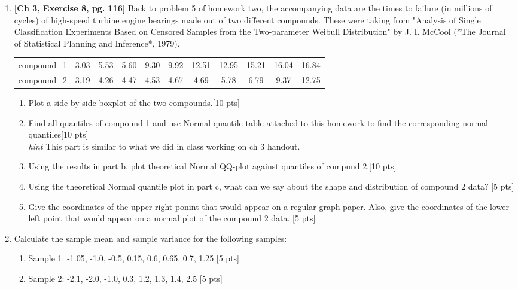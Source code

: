 \documentclass[11pt]{article}\usepackage[]{graphicx}\usepackage[]{color}
\begin{document}
\begin{enumerate}
\item \textbf{[Ch 3, Exercise 8, pg. 116]} Back to problem 5 of homework two,  the accompanying data are the times to failure (in millions of cycles) of high-speed turbine engine bearings made out of two different compounds. These were taking from "Analysis of Single Classification Experiments Based on Censored Samples from the Two-parameter Weibull Distribution" by J. I. McCool (*The Journal of Statistical Planning and Inference*, 1979).
    

\begin{center}
	\begin{tabular}{|ccccccccccc|}	
		\hline
		compound_1  & 3.03 & 5.53 & 5.60 & 9.30 & 9.92 & 12.51 & 12.95 & 15.21 & 16.04 & 16.84\\
		compound_2 & 3.19 & 4.26 & 4.47 & 4.53 & 4.67 & 4.69 & 5.78 & 6.79 & 9.37 & 12.75\\
		\hline
	\hline                 
	\end{tabular}
\end{center}

\begin{enumerate}
    \item Plot a side-by-side boxplot of the two compounds.[10 pts]
    \item Find all quantiles of compound 1 and use Normal quantile table attached to this homework to find the corresponding normal quantiles[10 pts]\\
    \emph{hint} This part is similar to what we did in class working on ch 3 handout. 
    \item Using the results in part b, plot theoretical Normal QQ-plot against quantiles of compund 2.[10 pts]
    \item Using the theoretical Normal quantile plot in part c, what can we say about the shape and distribution of compound 2 data? [5 pts]
    \item Give the coordinates  of the upper right ponint that would appear on a regular graph paper. Also, give the coordinates of the lower left point that would appear on a normal plot of the compound 2 data. [5 pts]
\end{enumerate}    


\item Calculate the sample mean and sample variance for the following samples:
\begin{enumerate}
	\item Sample 1: -1.05, -1.0, -0.5, 0.15, 0.6, 0.65, 0.7, 1.25 [5 pts]
	\item Sample 2: -2.1, -2.0, -1.0, 0.3, 1.2, 1.3, 1.4, 2.5 [5 pts]
\end{enumerate}




\end{enumerate}
\end{document}
